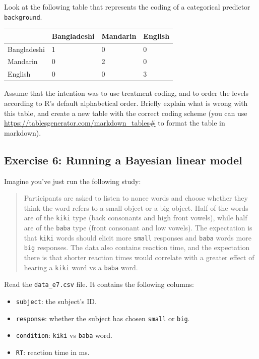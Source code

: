 \documentclass[
]{article}
\providecommand{\tightlist}{%
  \setlength{\itemsep}{0pt}\setlength{\parskip}{0pt}}
\begin{document}
Look at the following table that represents the coding of a categorical
predictor \texttt{background}.

\begin{longtable}[]{@{}llll@{}}
\toprule()
& Bangladeshi & Mandarin & English \\
\midrule()
\endhead
Bangladeshi & 1 & 0 & 0 \\
Mandarin & 0 & 2 & 0 \\
English & 0 & 0 & 3 \\
\bottomrule()
\end{longtable}

Assume that the intention was to use treatment coding, and to order the
levels according to R's default alphabetical order. Briefly explain what
is wrong with this table, and create a new table with the correct coding
scheme (you can use \url{https://tablesgenerator.com/markdown_tables\#}
to format the table in markdown).

\hypertarget{exercise-6-running-a-bayesian-linear-model}{%
\subsection{Exercise 6: Running a Bayesian linear
model}\label{exercise-6-running-a-bayesian-linear-model}}

Imagine you've just run the following study:

\begin{quote}
Participants are asked to listen to nonce words and choose whether they
think the word refers to a small object or a big object. Half of the
words are of the \texttt{kiki} type (back consonants and high front
vowels), while half are of the \texttt{baba} type (front consonant and
low vowels). The expectation is that \texttt{kiki} words should elicit
more \texttt{small} responses and \texttt{baba} words more \texttt{big}
responses. The data also contains reaction time, and the expectation
there is that shorter reaction times would correlate with a greater
effect of hearing a \texttt{kiki} word vs a \texttt{baba} word.
\end{quote}

Read the \texttt{data\_e7.csv} file. It contains the following columns:

\begin{itemize}
\tightlist
\item
  \texttt{subject}: the subject's ID.
\item
  \texttt{response}: whether the subject has chosen \texttt{small} or
  \texttt{big}.
\item
  \texttt{condition}: \texttt{kiki} vs \texttt{baba} word.
\item
  \texttt{RT}: reaction time in ms.
\end{itemize}
\end{document}
